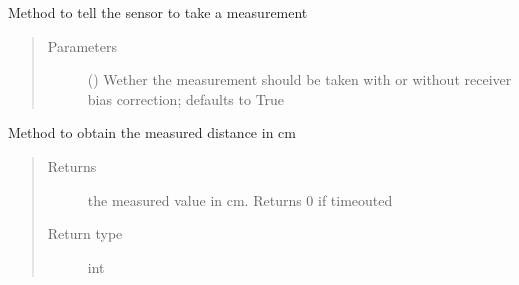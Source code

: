 \documentclass[letterpaper,10pt,english]{sphinxmanual}
\begin{document}
\begin{fulllineitems}
\begin{fulllineitems}
\begin{quote}
\begin{description}
\end{description}\end{quote}

\end{fulllineitems}


\begin{fulllineitems}
\label{\detokenize{sensor:lib.sensor.Sensor.measure}}
Method to tell the sensor to take a measurement
\begin{quote}\begin{description}
\item[{Parameters}] \leavevmode
{} () \textendash{} Wether the measurement should be taken with or without receiver bias correction; defaults to True

\end{description}\end{quote}

\end{fulllineitems}


\begin{fulllineitems}
\label{\detokenize{sensor:lib.sensor.Sensor.read_measurements}}
Method to obtain the measured distance in cm
\begin{quote}\begin{description}
\item[{Returns}] \leavevmode
the measured value in cm. Returns 0 if timeouted

\item[{Return type}] \leavevmode
int

\end{description}\end{quote}

\end{fulllineitems}


\end{fulllineitems}
\end{document}
